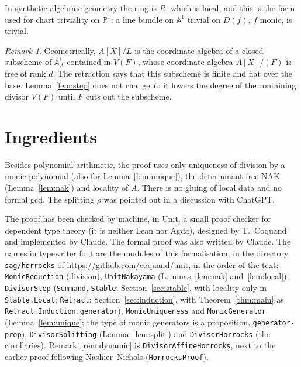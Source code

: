 \documentclass[11pt]{amsart}
\theoremstyle{remark}
\newtheorem{remark}[theorem]{Remark}
\begin{document}
In synthetic algebraic geometry the ring is $R$, which is local, and this
is the form used for chart triviality on $\mathbb P^1$: a line bundle on
$\mathbb A^1$ trivial on $D(f)$, $f$ monic, is trivial.

\begin{remark}
Geometrically, $A[X]/L$ is the coordinate algebra of a closed subscheme of
$\mathbb A^1_A$ contained in $V(F)$, whose coordinate algebra $A[X]/(F)$ is
free of rank $d$. The retraction says that this subscheme is finite and flat
over the base. Lemma~\ref{lem:step} does not change $L$: it lowers the
degree of the containing divisor $V(F)$ until $F$ cuts out the subscheme.
\end{remark}

\section{Ingredients}

Besides polynomial arithmetic, the proof uses only uniqueness of division by
a monic polynomial (also for Lemma~\ref{lem:unique}), the determinant-free NAK
(Lemma~\ref{lem:nak}) and locality of $A$. There is no gluing of local data
and no formal gcd. The splitting $\rho$ was pointed out in a discussion with
ChatGPT.

\begin{sloppypar}
The proof has been checked by machine, in \textsf{Unit}, a small proof
checker for dependent type theory (it is neither Lean nor Agda), designed
by T.~Coquand and implemented by Claude. The formal proof was also written
by Claude. The names in typewriter font are the modules of this
formalisation, in the directory \texttt{sag/horrocks} of
\url{https://github.com/coquand/unit}, in the order of the text: \texttt{MonicReduction} (division), \texttt{UnitNakayama}
(Lemmas~\ref{lem:nak} and~\ref{lem:local}), \texttt{DivisorStep}
(\texttt{Summand}, \texttt{Stable}: Section~\ref{sec:stable}, with locality
only in \texttt{Stable.Local};
\texttt{Retract}: Section~\ref{sec:induction}, with
Theorem~\ref{thm:main} as \texttt{Retract.Induction.generator}),
\texttt{MonicUniqueness} and \texttt{MonicGenerator} (Lemma~\ref{lem:unique};
the type of monic generators is a proposition, \texttt{generator-prop}),
\texttt{DivisorSplitting} (Lemma~\ref{lem:split}) and
\texttt{DivisorHorrocks} (the corollaries). Remark~\ref{rem:dynamic} is
\texttt{DivisorAffineHorrocks}, next to the earlier proof following
Nashier--Nichols (\texttt{HorrocksProof}).
\end{sloppypar}
\end{document}
